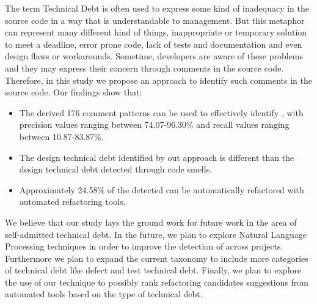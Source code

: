 The term Technical Debt is often used to express some kind of inadequacy in the source code in a way that is understandable to management. But this metaphor can represent many different kind of things, inappropriate or temporary solution to meet a deadline, error prone code, lack of tests and documentation and even design flaws or workarounds. Sometime, developers are aware of these problems and they may express their concern through comments in the source code. Therefore, in this study we propose an approach to identify such comments in the source code. Our findings show that:

\begin{itemize}
\item The derived 176 comment patterns can be used to effectively identify \SADTD, with precision values ranging between 74.07-96.30\% and recall values ranging between 10.87-83.87\%.
\item The design technical debt identified by out approach is different than the design technical debt detected through code smells. 

\item Approximately 24.58\% of the detected \SADTD can be automatically refactored with automated refactoring tools.

\end{itemize} 


We believe that our study lays the ground work for future work in the area of self-admitted technical debt. In the future, we plan to explore Natural Language Processing techniques in order to improve the detection of \SADTD across projects. Furthermore we plan to expand the current taxonomy to include more categories of technical debt like defect and test technical debt. Finally, we plan to explore the use of our technique to possibly rank refactoring candidates suggestions from automated tools based on the type of technical debt. 